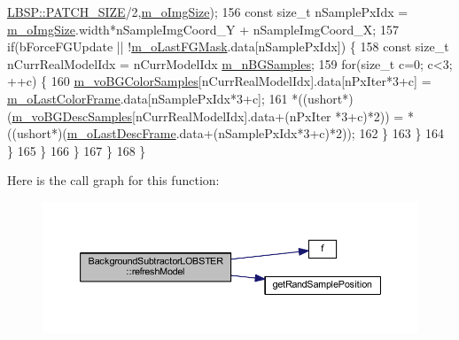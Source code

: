 \begin{DoxyCode}
      \mbox{\hyperlink{class_l_b_s_p_aa98abb79a155d3a2b416c2ab32e74929}{LBSP::PATCH\_SIZE}}/2,\mbox{\hyperlink{class_background_subtractor_l_b_s_p_a732d5e6ae35fb0e858cadb3af5ce08a2}{m\_oImgSize}});
156                     \textcolor{keyword}{const} \textcolor{keywordtype}{size\_t} nSamplePxIdx = \mbox{\hyperlink{class_background_subtractor_l_b_s_p_a732d5e6ae35fb0e858cadb3af5ce08a2}{m\_oImgSize}}.width*nSampleImgCoord\_Y + 
      nSampleImgCoord\_X;
157                     \textcolor{keywordflow}{if}(bForceFGUpdate || !\mbox{\hyperlink{class_background_subtractor_l_b_s_p_adb6dc0af596c5592c91f9d8faa5c8a4b}{m\_oLastFGMask}}.data[nSamplePxIdx]) \{
158                         \textcolor{keyword}{const} \textcolor{keywordtype}{size\_t} nCurrRealModelIdx = nCurrModelIdx%
      \mbox{\hyperlink{class_background_subtractor_l_o_b_s_t_e_r_a20c53540b952d608d849a305fd5eed89}{m\_nBGSamples}};
159                         \textcolor{keywordflow}{for}(\textcolor{keywordtype}{size\_t} c=0; c<3; ++c) \{
160                             \mbox{\hyperlink{class_background_subtractor_l_o_b_s_t_e_r_ac981b39f8ae7b28d3e4326d8e6be6332}{m\_voBGColorSamples}}[nCurrRealModelIdx].data[nPxIter*3+c] = 
      \mbox{\hyperlink{class_background_subtractor_l_b_s_p_ab1dc003792ab1d0b881a6fd10e0e29b3}{m\_oLastColorFrame}}.data[nSamplePxIdx*3+c];
161                             *((ushort*)(\mbox{\hyperlink{class_background_subtractor_l_o_b_s_t_e_r_a3c49866ae652423b2173215957907d04}{m\_voBGDescSamples}}[nCurrRealModelIdx].data+(nPxIter
      *3+c)*2)) = *((ushort*)(\mbox{\hyperlink{class_background_subtractor_l_b_s_p_a9c637c0b87cac495887295690d83ba13}{m\_oLastDescFrame}}.data+(nSamplePxIdx*3+c)*2));
162                         \}
163                     \}
164                 \}
165             \}
166         \}
167     \}
168 \}
\end{DoxyCode}
Here is the call graph for this function\+:\nopagebreak
\begin{figure}[H]
\begin{center}
\leavevmode
\includegraphics[width=350pt]{class_background_subtractor_l_o_b_s_t_e_r_aeb3b23c1f47cfe71a73f3ca47ec06a75_cgraph}
\end{center}
\end{figure}
